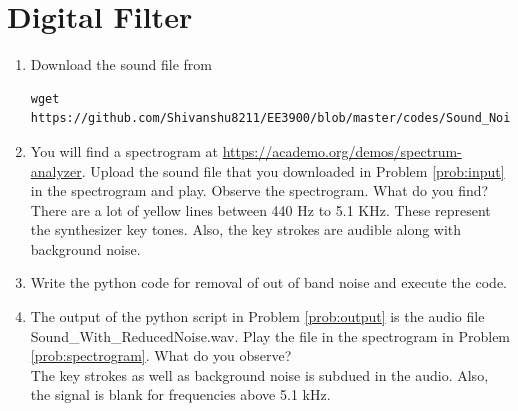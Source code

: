 \documentclass[journal,12pt,twocolumn]{IEEEtran}
\renewcommand\thesection{\arabic{section}}
\begin{document}
\section{Digital Filter}
\begin{enumerate}[label=\thesection.\arabic*
          ,ref=\thesection.\theenumi]
     \item
           \label{prob:input}
           Download the sound file from
           \begin{lstlisting}
wget https://github.com/Shivanshu8211/EE3900/blob/master/codes/Sound_Noise.wav
\end{lstlisting}
     \item
           \label{prob:spectrogram}
           You will find a spectrogram at \href{https://academo.org/demos/spectrum-analyzer}{\url{https://academo.org/demos/spectrum-analyzer}}.
           Upload the sound file that you downloaded in Problem \ref{prob:input} in the spectrogram  and play.  Observe the spectrogram. What do you find?
           \\
           \solution There are a lot of yellow lines between 440 Hz to 5.1 KHz.  These represent the synthesizer key tones. Also, the key strokes
           are audible along with background noise.
     \item
           \label{prob:output}
           Write the python code for removal of out of band noise and execute the code.
           \\
           \solution
           
     \item
           The output of the python script in Problem \ref{prob:output} is the audio file Sound\_With\_ReducedNoise.wav. Play the file in the spectrogram in Problem \ref{prob:spectrogram}. What do you observe?
           \\
           \solution The key strokes as well as background noise is subdued in the audio.  Also,  the signal is blank for frequencies above 5.1 kHz.

\end{enumerate}
\end{document}
